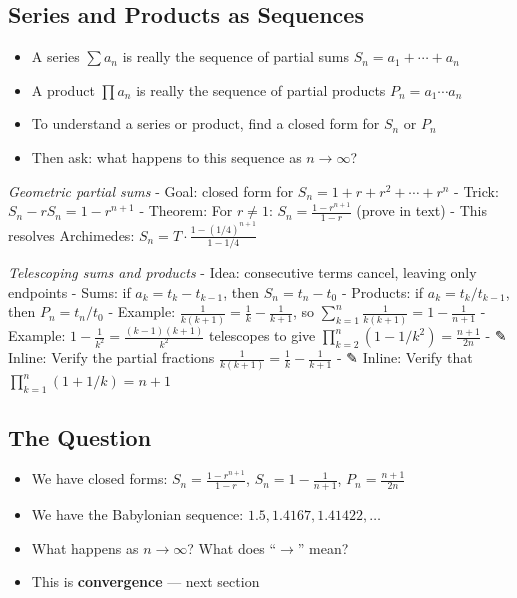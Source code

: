 \documentclass[
  10pt,
  letterpaper,
]{scrbook}
\providecommand{\tightlist}{%
  \setlength{\itemsep}{0pt}\setlength{\parskip}{0pt}}
\begin{document}
\subsection{Series and Products as
Sequences}\label{series-and-products-as-sequences}

\begin{itemize}
\tightlist
\item
  A series \(\sum a_n\) is really the sequence of partial sums
  \(S_n = a_1 + \cdots + a_n\)
\item
  A product \(\prod a_n\) is really the sequence of partial products
  \(P_n = a_1 \cdots a_n\)
\item
  To understand a series or product, find a closed form for \(S_n\) or
  \(P_n\)
\item
  Then ask: what happens to this sequence as \(n \to \infty\)?
\end{itemize}

\emph{Geometric partial sums} - Goal: closed form for
\(S_n = 1 + r + r^2 + \cdots + r^n\) - Trick:
\(S_n - rS_n = 1 - r^{n+1}\) - Theorem: For \(r \neq 1\):
\(S_n = \frac{1 - r^{n+1}}{1 - r}\) (prove in text) - This resolves
Archimedes: \(S_n = T \cdot \frac{1 - (1/4)^{n+1}}{1 - 1/4}\)

\emph{Telescoping sums and products} - Idea: consecutive terms cancel,
leaving only endpoints - Sums: if \(a_k = t_k - t_{k-1}\), then
\(S_n = t_n - t_0\) - Products: if \(a_k = t_k / t_{k-1}\), then
\(P_n = t_n / t_0\) - Example:
\(\frac{1}{k(k+1)} = \frac{1}{k} - \frac{1}{k+1}\), so
\(\sum_{k=1}^{n} \frac{1}{k(k+1)} = 1 - \frac{1}{n+1}\) - Example:
\(1 - \frac{1}{k^2} = \frac{(k-1)(k+1)}{k^2}\) telescopes to give
\(\prod_{k=2}^{n}(1 - 1/k^2) = \frac{n+1}{2n}\) - ✎ Inline: Verify the
partial fractions \(\frac{1}{k(k+1)} = \frac{1}{k} - \frac{1}{k+1}\) - ✎
Inline: Verify that \(\prod_{k=1}^{n}(1 + 1/k) = n + 1\)

\subsection{The Question}\label{the-question}

\begin{itemize}
\tightlist
\item
  We have closed forms: \(S_n = \frac{1 - r^{n+1}}{1-r}\),
  \(S_n = 1 - \frac{1}{n+1}\), \(P_n = \frac{n+1}{2n}\)
\item
  We have the Babylonian sequence: \(1.5, 1.4167, 1.41422, \ldots\)
\item
  What happens as \(n \to \infty\)? What does ``\(\to\)'' mean?
\item
  This is \textbf{convergence} --- next section
\end{itemize}
\end{document}
